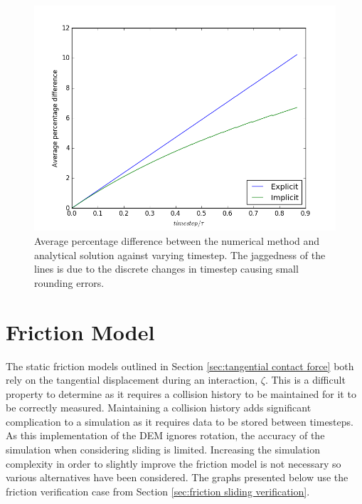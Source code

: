 \documentclass[a4paper,11pt,titlepage]{report}
\begin{document}
\begin{figure}[!htb]
\centering
\includegraphics[scale=0.6]{figures/AveragePercentageDifferenceAgainstTimestep.png}
\caption{Average percentage difference between the numerical method and analytical solution against varying timestep. The jaggedness of the lines is due to the discrete changes in timestep causing small rounding errors.}
\label{fig:avg_percent_diff_against_timestep}
\end{figure}
\section{Friction Model}
\label{sec:friction model}
The static friction models outlined in Section \ref{sec:tangential contact force} both rely on the tangential displacement during an interaction, $\zeta$. This is a difficult property to determine as it requires a collision history to be maintained for it to be correctly measured. Maintaining a collision history adds significant complication to a simulation as it requires data to be stored between timesteps. As this implementation of the DEM ignores rotation, the accuracy of the simulation when considering sliding is limited. Increasing the simulation complexity in order to slightly improve the friction model is not necessary so various alternatives have been considered. The graphs presented below use the friction verification case from Section \ref{sec:friction sliding verification}.
\end{document}
